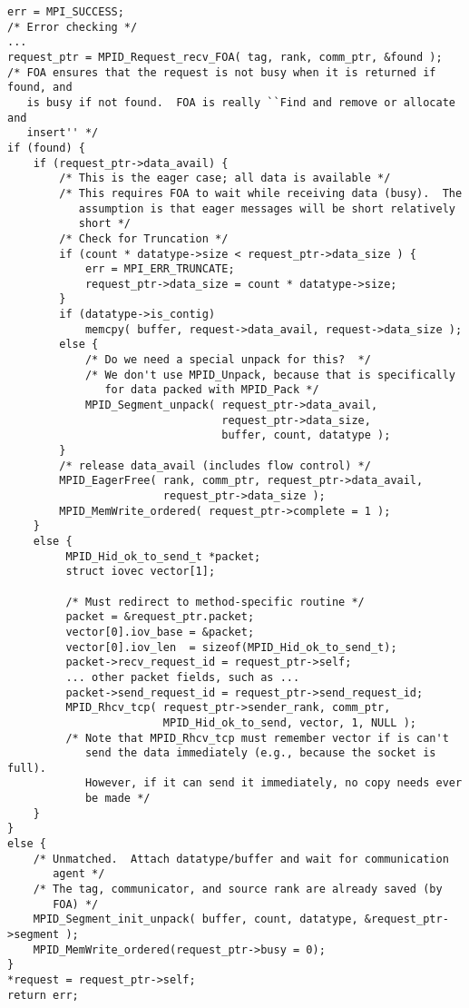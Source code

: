 \begin{verbatim}
err = MPI_SUCCESS;
/* Error checking */
...
request_ptr = MPID_Request_recv_FOA( tag, rank, comm_ptr, &found );
/* FOA ensures that the request is not busy when it is returned if found, and
   is busy if not found.  FOA is really ``Find and remove or allocate and 
   insert'' */
if (found) {
    if (request_ptr->data_avail) {
        /* This is the eager case; all data is available */
        /* This requires FOA to wait while receiving data (busy).  The
           assumption is that eager messages will be short relatively
           short */
        /* Check for Truncation */
        if (count * datatype->size < request_ptr->data_size ) {
            err = MPI_ERR_TRUNCATE;
            request_ptr->data_size = count * datatype->size;
        }
        if (datatype->is_contig) 
            memcpy( buffer, request->data_avail, request->data_size );
        else {
            /* Do we need a special unpack for this?  */
            /* We don't use MPID_Unpack, because that is specifically
               for data packed with MPID_Pack */
            MPID_Segment_unpack( request_ptr->data_avail, 
                                 request_ptr->data_size, 
                                 buffer, count, datatype );
        }
        /* release data_avail (includes flow control) */
        MPID_EagerFree( rank, comm_ptr, request_ptr->data_avail,
                        request_ptr->data_size );
        MPID_MemWrite_ordered( request_ptr->complete = 1 );
    }
    else {
         MPID_Hid_ok_to_send_t *packet;
         struct iovec vector[1];

         /* Must redirect to method-specific routine */
         packet = &request_ptr.packet;
         vector[0].iov_base = &packet;
         vector[0].iov_len  = sizeof(MPID_Hid_ok_to_send_t);
         packet->recv_request_id = request_ptr->self;
         ... other packet fields, such as ...
         packet->send_request_id = request_ptr->send_request_id;
         MPID_Rhcv_tcp( request_ptr->sender_rank, comm_ptr,
                        MPID_Hid_ok_to_send, vector, 1, NULL );
         /* Note that MPID_Rhcv_tcp must remember vector if is can't
            send the data immediately (e.g., because the socket is full).
            However, if it can send it immediately, no copy needs ever
            be made */
    }
}
else {
    /* Unmatched.  Attach datatype/buffer and wait for communication
       agent */
    /* The tag, communicator, and source rank are already saved (by
       FOA) */ 
    MPID_Segment_init_unpack( buffer, count, datatype, &request_ptr->segment );
    MPID_MemWrite_ordered(request_ptr->busy = 0);
}
*request = request_ptr->self;
return err;
\end{verbatim}


